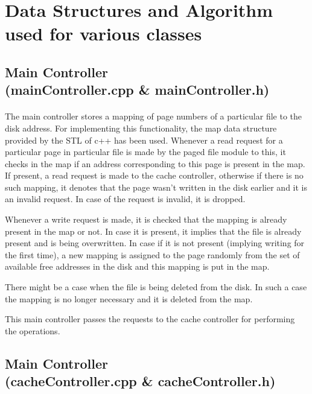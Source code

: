 \documentclass[11pt]{article}
\begin{document}
\section{Data Structures and Algorithm used for various classes}

\subsection{Main Controller \\ (mainController.cpp \& mainController.h)}
\paragraph{}
The main controller stores a mapping of page numbers of a particular file to the disk address. For implementing this functionality, the map data structure provided by the STL of c++ has been used. Whenever a read request for a particular page in particular file is made by the paged file module to this, it checks in the map if an address corresponding to this page is present in the map. If present, a read request is made to the cache controller, otherwise if there is no such mapping, it denotes that the page wasn't written in the disk earlier and it is an invalid request. In case of the request is invalid, it is dropped.

Whenever a write request is made, it is checked that the mapping is already present in the map or not. In case it is present, it implies that the file is already present and is being overwritten. In case if it is not present (implying writing for the first time), a new mapping is assigned to the page randomly from the set of available free addresses in the disk and this mapping is put in the map.

There might be a case when the file is being deleted from the disk. In such a case the mapping is no longer necessary and it is deleted from the map.

This main controller passes the requests to the cache controller for performing the operations.

\subsection{Main Controller \\ (cacheController.cpp \& cacheController.h)}
\paragraph{}
\end{document}
